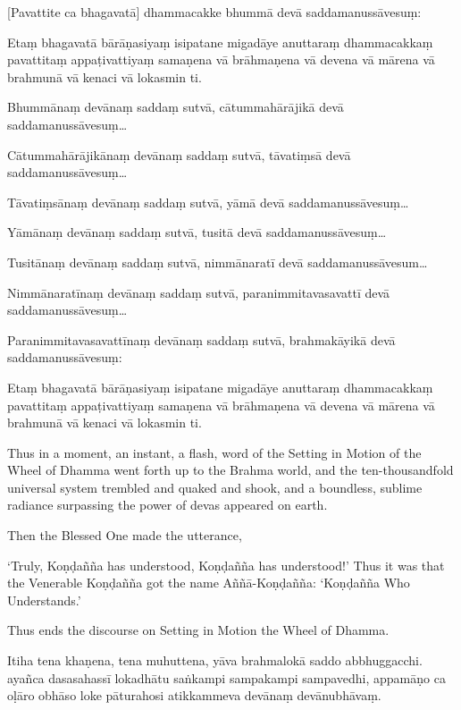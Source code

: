 [Pavattite ca bhagavatā] dhammacakke bhummā devā saddamanussāvesuṃ:

Etaṃ bhagavatā bārāṇasiyaṃ isipatane migadāye anuttaraṃ dhammacakkaṃ
pavattitaṃ appaṭivattiyaṃ samaṇena vā brāhmaṇena vā devena vā mārena vā
brahmunā vā kenaci vā lokasmin ti.

Bhummānaṃ devānaṃ saddaṃ sutvā, cātummahārājikā devā
saddamanussāvesuṃ\ldots

Cātummahārājikānaṃ devānaṃ saddaṃ sutvā, tāvatiṃsā devā
saddamanussāvesuṃ\ldots

Tāvatiṃsānaṃ devānaṃ saddaṃ sutvā, yāmā devā saddamanussāvesuṃ\ldots

Yāmānaṃ devānaṃ saddaṃ sutvā, tusitā devā saddamanussāvesuṃ\ldots

Tusitānaṃ devānaṃ saddaṃ sutvā, nimmānaratī devā saddamanussāvesum\ldots

Nimmānaratīnaṃ devānaṃ saddaṃ sutvā, paranimmitavasavattī devā
saddamanussāvesuṃ\ldots

Paranimmitavasavattīnaṃ devānaṃ saddaṃ sutvā, brahmakāyikā devā
saddamanussāvesuṃ:

Etaṃ bhagavatā bārāṇasiyaṃ isipatane migadāye anuttaraṃ dhammacakkaṃ
pavattitaṃ appaṭivattiyaṃ samaṇena vā brāhmaṇena vā devena vā mārena vā
brahmunā vā kenaci vā lokasmin ti.

\clearpage

\englishText
\markboth{\englishTitle}{\rightmark}

Thus in a moment, an instant, a flash, word of the Setting in Motion of
the Wheel of Dhamma went forth up to the Brahma world, and the
ten-thousandfold universal system trembled and quaked and shook, and a
boundless, sublime radiance surpassing the power of devas appeared on
earth.

Then the Blessed One made the utterance,

‘Truly, Koṇḍañña has understood, Koṇḍañña has understood!’ Thus it was
that the Venerable Koṇḍañña got the name Aññā-Koṇḍañña: ‘Koṇḍañña Who
Understands.’

Thus ends the discourse on Setting in Motion the Wheel of Dhamma.

\clearpage

\paliText
\markboth{\paliTitle}{\rightmark}

Itiha tena khaṇena, tena muhuttena, yāva brahmalokā saddo abbhuggacchi.
ayañca dasasahassī lokadhātu saṅkampi sampakampi sampavedhi, appamāṇo ca
oḷāro obhāso loke pāturahosi atikkammeva devānaṃ devānubhāvaṃ.

